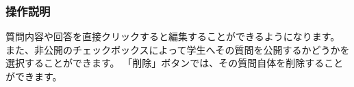 \subsubsection{操作説明}
質問内容や回答を直接クリックすると編集することができるようになります。
また、非公開のチェックボックスによって学生へその質問を公開するかどうかを選択することができます。
「削除」ボタンでは、その質問自体を削除することができます。




